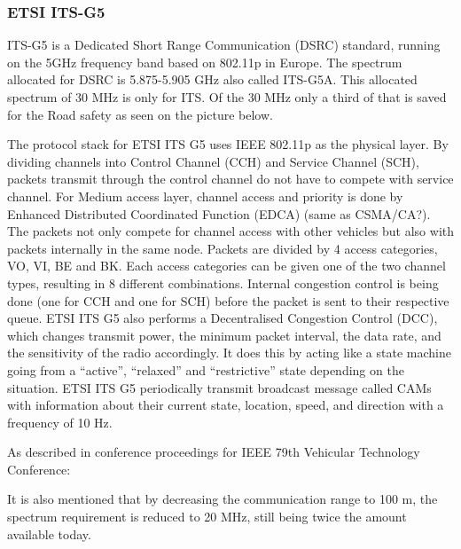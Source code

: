 \subsubsection{ETSI ITS-G5}
ITS-G5 is a Dedicated Short Range Communication (DSRC) standard, running on the 5GHz frequency band based on 802.11p in Europe.
The spectrum allocated for DSRC is 5.875-5.905 GHz also called ITS-G5A. This allocated spectrum of 30 MHz is only for ITS. Of the 30 MHz only a third of that is saved for the Road safety as seen on the picture below.\par
% 
The protocol stack for ETSI ITS G5 uses IEEE 802.11p as the physical layer. By dividing channels into Control Channel (CCH) and Service Channel (SCH), packets transmit through the control channel do not have to compete with service channel. For Medium access layer, channel access and priority is done by Enhanced Distributed Coordinated Function (EDCA) (same as CSMA/CA?). The packets not only compete for channel access with other vehicles but also with packets internally in the same node. Packets are divided by 4 access categories, VO, VI, BE and BK. Each access categories can be given one of the two channel types, resulting in 8 different combinations. Internal congestion control is being done (one for CCH and one for SCH) before the packet is sent to their respective queue. ETSI ITS G5 also performs a Decentralised Congestion Control (DCC), which changes transmit power, the minimum packet interval, the data rate, and the sensitivity of the radio accordingly. It does this by acting like a state machine going from a “active”, “relaxed” and “restrictive” state depending on the situation.
ETSI ITS G5 periodically transmit broadcast message called CAMs with information about their current state, location, speed, and direction with a frequency of 10 Hz.\par
% 
As described in conference proceedings for IEEE 79th Vehicular Technology Conference: \par 
% 
It is also mentioned that by decreasing the communication range to 100 m, the spectrum requirement is reduced to 20 MHz, still being twice the amount available today. 